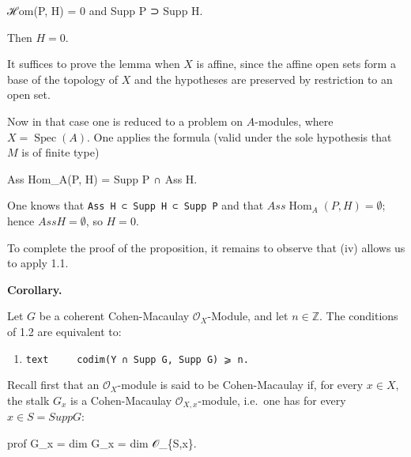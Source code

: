 \documentclass[
]{article}
\newenvironment{Shaded}{}{}
\newcommand{\NormalTok}[1]{#1}
\begin{document}
\begin{Shaded}
\begin{Highlighting}[]
\NormalTok{ℋom(P, H) = 0 and Supp P ⊃ Supp H.}
\end{Highlighting}
\end{Shaded}

Then \(H = 0\).

It suffices to prove the lemma when \(X\) is affine, since the affine
open sets form a base of the topology of \(X\) and the hypotheses are
preserved by restriction to an open set.

Now in that case one is reduced to a problem on \(A\)-modules, where
\(X = \operatorname{Spec}(A)\). One applies the formula (valid under the
sole hypothesis that \(M\) is of finite type)

\begin{Shaded}
\begin{Highlighting}[]
\NormalTok{Ass Hom\_A(P, H) = Supp P ∩ Ass H.}
\end{Highlighting}
\end{Shaded}

One knows that \texttt{Ass\ H\ ⊂\ Supp\ H\ ⊂\ Supp\ P} and that
\(Ass \operatorname{Hom}_{A}(P, H) = \emptyset\); hence
\(Ass H = \emptyset\), so \(H = 0\).

To complete the proof of the proposition, it remains to observe that
(iv) allows us to apply 1.1.

\textbf{Corollary.}

Let \(G\) be a coherent Cohen-Macaulay \(\mathcal{O}_{X}\)-Module, and
let \(n \in \mathbb{Z}\). The conditions of 1.2 are equivalent to:

\begin{enumerate}
\def\labelenumi{\arabic{enumi}.}
\item
  \texttt{text\ \ \ \ \ codim(Y\ ∩\ Supp\ G,\ Supp\ G)\ ⩾\ n.}
\end{enumerate}

Recall first that an \(\mathcal{O}_{X}\)-module is said to be
Cohen-Macaulay if, for every \(x \in X\), the stalk \(G_{x}\) is a
Cohen-Macaulay \(\mathcal{O}_{X,x}\)-module, i.e.~one has for every
\(x \in S = Supp G\):

\begin{Shaded}
\begin{Highlighting}[]
\NormalTok{prof G\_x = dim G\_x = dim 𝒪\_\{S,x\}.}
\end{Highlighting}
\end{Shaded}
\end{document}

